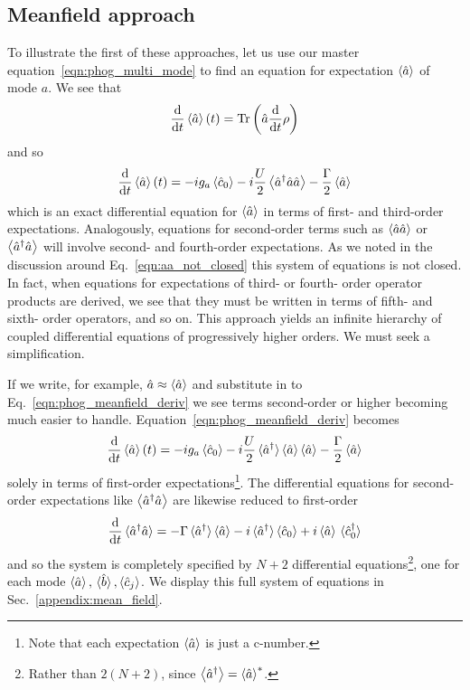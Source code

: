 \subsection{Meanfield approach}\label{sec:meanfield}
To illustrate the first of these approaches, let us use our master equation~\ref{eqn:phog_multi_mode} to find an equation for expectation $\ev{\hat{a}}$ of mode $a$. We see that
\begin{equation}
\ddt \ev{\hat{a}}\left(t\right) = \text{Tr}\left( \hat{a} \ddt \rho\right)
\end{equation}
and so
\begin{equation}\label{eqn:phog_meanfield_deriv}
\ddt \ev{\hat{a}}\left(t\right) = - i g_a \ev{\hat{c}_0} - i \frac{U}{2} \ev{\hat{a}^\dagger \hat{a}\hat{a}} - \frac{\Gamma}{2} \ev{\hat{a}}
\end{equation}
which is an exact differential equation for $\ev{\hat{a}}$ in terms of first- and third-order expectations. Analogously, equations for second-order terms such as $\ev{\hat{a}\hat{a}}$ or $\ev{\hat{a}^\dagger \hat{a}}$ will involve second- and fourth-order expectations. As we noted in the discussion around Eq.~\ref{eqn:aa_not_closed} this system of equations is not closed. In fact, when equations for expectations of third- or fourth- order operator products are derived, we see that they must be written in terms of fifth- and sixth- order operators, and so on. This approach yields an infinite hierarchy of coupled differential equations of progressively higher orders. We must seek a simplification.

If we write, for example, $\hat{a} \approx \ev{\hat{a}}$ and substitute in to Eq.~\ref{eqn:phog_meanfield_deriv} we see terms second-order or higher becoming much easier to handle. Equation~\ref{eqn:phog_meanfield_deriv} becomes
\begin{equation}\label{eqn:phog_meanfield_deriv_1}
\ddt \ev{\hat{a}}\left(t\right) = - i g_a \ev{\hat{c}_0} - i \frac{U}{2} \ev*{\hat{a}^\dagger} \ev{\hat{a}} \ev{\hat{a}} - \frac{\Gamma}{2} \ev{\hat{a}}
\end{equation}
solely in terms of first-order expectations\footnote{Note that each expectation $\ev{\hat{a}}$ is just a c-number.}. The differential equations for second-order expectations like $\ev{\hat{a}^\dagger \hat{a}}$ are likewise reduced to first-order
\begin{equation}
\ddt \ev*{\hat{a}^\dagger \hat{a}} = - \Gamma \ev*{\hat{a}^\dagger}\ev{\hat{a}} - i \ev*{\hat{a}^\dagger}\ev{\hat{c}_0} + i \ev{\hat{a}}\ev*{\hat{c}_0^\dagger}
\end{equation}
and so the system is completely specified by $N+2$ differential equations\footnote{Rather than $2(N+2)$, since $\ev{\hat{a}^\dagger} = \ev{\hat{a}}^*$.}, one for each mode $\ev{\hat{a}}, \ev*{\hat{b}}, \ev{\hat{c}_j}$. We display this full system of equations in Sec.~\ref{appendix:mean_field}. 


